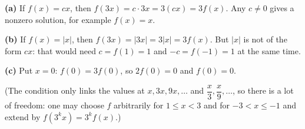 \textbf{(a)} If $f(x)=cx$, then $f(3x)=c\cdot3x=3(cx)=3f(x)$. Any $c\ne0$ gives a nonzero solution, for example $f(x)=x$.

\textbf{(b)} If $f(x)=|x|$, then $f(3x)=|3x|=3|x|=3f(x)$. But $|x|$ is not of the form $cx$: that would need $c=f(1)=1$ and $-c=f(-1)=1$ at the same time.

\textbf{(c)} Put $x=0$: $f(0)=3f(0)$, so $2f(0)=0$ and $f(0)=0$.

(The condition only links the values at $x,3x,9x,\dots$ and $\dfrac {x}{3},\dfrac {x}{9},\dots$, so there is a lot of freedom: one may choose $f$ arbitrarily for $1\le x<3$ and for $-3<x\le-1$ and extend by $f(3^kx)=3^kf(x)$.)
